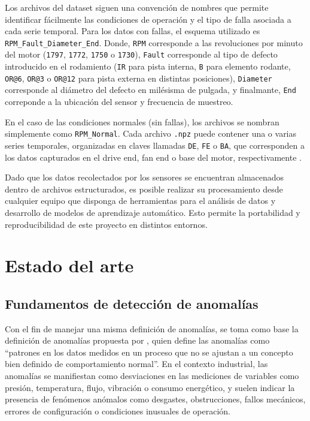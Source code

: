 \documentclass[11pt,a4paper,spanish]{book}
\numberwithin{equation}{chapter}
\numberwithin{figure}{chapter}
\begin{document}
Los archivos del dataset siguen una convención de nombres que permite identificar 
fácilmente las condiciones de operación y el tipo de falla asociada a cada serie temporal.
Para los datos con fallas, el esquema utilizado es \texttt{RPM\_Fault\_Diameter\_End}.
Donde, \texttt{RPM} corresponde a las revoluciones por minuto del motor 
(\texttt{1797}, \texttt{1772}, \texttt{1750} o \texttt{1730}), \texttt{Fault} corresponde 
al tipo de defecto introducido en el rodamiento (\texttt{IR} para pista interna, 
\texttt{B} para elemento rodante, \texttt{OR@6}, \texttt{OR@3} o \texttt{OR@12} 
para pista externa en distintas posiciones), \texttt{Diameter} corresponde al 
diámetro del defecto en milésisma de pulgada, y finalmante, \texttt{End} correponde a
la ubicación del sensor y frecuencia de muestreo.


En el caso de las condiciones normales (sin fallas), los archivos se nombran simplemente 
como \texttt{RPM\_Normal}. 
Cada archivo \texttt{.npz} puede contener una o varias series temporales, 
organizadas en claves llamadas \texttt{DE}, \texttt{FE} o \texttt{BA}, que corresponden 
a los datos capturados en el drive end, fan end o base del motor, respectivamente 
\cite{rigas2024marine}.


Dado que los datos recolectados por los sensores se encuentran almacenados dentro de 
archivos estructurados, es posible realizar su procesamiento desde cualquier equipo 
que disponga de herramientas para el análisis de datos y desarrollo de modelos de 
aprendizaje automático. 
Esto permite la portabilidad y reproducibilidad de este proyecto en distintos entornos.


\section{Estado del arte}

\subsection{Fundamentos de detección de anomalías}

Con el fin de manejar una misma definición de anomalías, se toma como base la 
definición de anomalías propuesta por \cite{leon2012anomalias}, quien define las 
anomalías como “patrones en los datos medidos en un proceso que no se ajustan a un 
concepto bien definido de comportamiento normal”. 
En el contexto industrial, las anomalías se manifiestan como desviaciones en las 
mediciones de variables como presión, temperatura, flujo, vibración o consumo 
energético, y suelen indicar la presencia de fenómenos anómalos como desgastes, 
obstrucciones, fallos mecánicos, errores de configuración o condiciones inusuales 
de operación.
\end{document}
